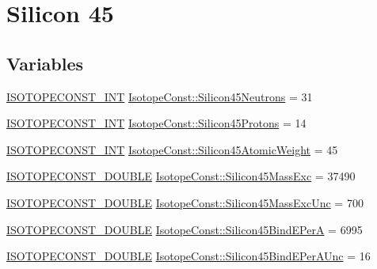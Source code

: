 \hypertarget{group___isotope_const-_silicon-_si45}{}\section{Silicon 45}
\label{group___isotope_const-_silicon-_si45}
\subsection*{Variables}
\begin{DoxyCompactItemize}
\item 
\mbox{\hyperlink{group___isotope_const-_macros_ga5f18360b3e99483a35c32d789e62621c}{I\+S\+O\+T\+O\+P\+E\+C\+O\+N\+S\+T\+\_\+\+I\+NT}} \mbox{\hyperlink{group___isotope_const-_silicon-_si45_gad164a042c0c3a7ef30e4495cd7315756}{Isotope\+Const\+::\+Silicon45\+Neutrons}} = 31
\item 
\mbox{\hyperlink{group___isotope_const-_macros_ga5f18360b3e99483a35c32d789e62621c}{I\+S\+O\+T\+O\+P\+E\+C\+O\+N\+S\+T\+\_\+\+I\+NT}} \mbox{\hyperlink{group___isotope_const-_silicon-_si45_ga92387918ab4d551306ca2523cc04a981}{Isotope\+Const\+::\+Silicon45\+Protons}} = 14
\item 
\mbox{\hyperlink{group___isotope_const-_macros_ga5f18360b3e99483a35c32d789e62621c}{I\+S\+O\+T\+O\+P\+E\+C\+O\+N\+S\+T\+\_\+\+I\+NT}} \mbox{\hyperlink{group___isotope_const-_silicon-_si45_ga7bfc811821704756388b8378f0e18954}{Isotope\+Const\+::\+Silicon45\+Atomic\+Weight}} = 45
\item 
\mbox{\hyperlink{group___isotope_const-_macros_ga8f45a7272ce02c0b4c65c44636ed719a}{I\+S\+O\+T\+O\+P\+E\+C\+O\+N\+S\+T\+\_\+\+D\+O\+U\+B\+LE}} \mbox{\hyperlink{group___isotope_const-_silicon-_si45_ga076196da8f92fe9ac70b03695a4b3050}{Isotope\+Const\+::\+Silicon45\+Mass\+Exc}} = 37490
\item 
\mbox{\hyperlink{group___isotope_const-_macros_ga8f45a7272ce02c0b4c65c44636ed719a}{I\+S\+O\+T\+O\+P\+E\+C\+O\+N\+S\+T\+\_\+\+D\+O\+U\+B\+LE}} \mbox{\hyperlink{group___isotope_const-_silicon-_si45_ga02162cac4878e16854b55bd5cd07f437}{Isotope\+Const\+::\+Silicon45\+Mass\+Exc\+Unc}} = 700
\item 
\mbox{\hyperlink{group___isotope_const-_macros_ga8f45a7272ce02c0b4c65c44636ed719a}{I\+S\+O\+T\+O\+P\+E\+C\+O\+N\+S\+T\+\_\+\+D\+O\+U\+B\+LE}} \mbox{\hyperlink{group___isotope_const-_silicon-_si45_ga62887039500acbc99b9a44725eab55fe}{Isotope\+Const\+::\+Silicon45\+Bind\+E\+PerA}} = 6995
\item 
\mbox{\hyperlink{group___isotope_const-_macros_ga8f45a7272ce02c0b4c65c44636ed719a}{I\+S\+O\+T\+O\+P\+E\+C\+O\+N\+S\+T\+\_\+\+D\+O\+U\+B\+LE}} \mbox{\hyperlink{group___isotope_const-_silicon-_si45_ga9ed1932c85337c80ddd1479105d0c0bf}{Isotope\+Const\+::\+Silicon45\+Bind\+E\+Per\+A\+Unc}} = 16

\end{DoxyCompactItemize}
